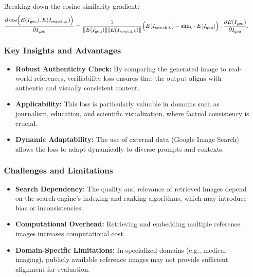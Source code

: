 Breaking down the cosine similarity gradient:
\[
\frac{\partial \cos\Bigl(E(I_{\text{gen}}), E(I_{\text{search},k})\Bigr)}{\partial I_{\text{gen}}} =
\frac{1}{\|E(I_{\text{gen}})\| \|E(I_{\text{search},k})\|}
\Bigl(E(I_{\text{search},k}) - \text{sim}_{k} \cdot E(I_{\text{gen}})\Bigr)
\cdot \frac{\partial E(I_{\text{gen}})}{\partial I_{\text{gen}}}.
\]


\subsubsection{Key Insights and Advantages}
\begin{itemize}
    \item \textbf{Robust Authenticity Check:} By comparing the generated image to real-world references, verifiability loss ensures that the output aligns with authentic and visually consistent content.
    \item \textbf{Applicability:} This loss is particularly valuable in domains such as journalism, education, and scientific visualization, where factual consistency is crucial.
    \item \textbf{Dynamic Adaptability:} The use of external data (Google Image Search) allows the loss to adapt dynamically to diverse prompts and contexts.
\end{itemize}


\subsubsection{Challenges and Limitations}
\begin{itemize}
    \item \textbf{Search Dependency:} The quality and relevance of retrieved images depend on the search engine’s indexing and ranking algorithms, which may introduce bias or inconsistencies.
    \item \textbf{Computational Overhead:} Retrieving and embedding multiple reference images increases computational cost.
    \item \textbf{Domain-Specific Limitations:} In specialized domains (e.g., medical imaging), publicly available reference images may not provide sufficient alignment for evaluation.
\end{itemize}



